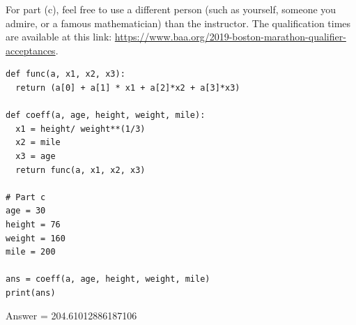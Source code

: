 \documentclass[10pt]{exam}
\begin{document}
\begin{questions}
For part (c), feel free to use a different person (such as yourself, someone you admire, or a famous mathematician) than the instructor. The qualification times are available at this link: \url{https://www.baa.org/2019-boston-marathon-qualifier-acceptances}.
\begin{lstlisting}
def func(a, x1, x2, x3):
  return (a[0] + a[1] * x1 + a[2]*x2 + a[3]*x3)

def coeff(a, age, height, weight, mile):
  x1 = height/ weight**(1/3)
  x2 = mile
  x3 = age
  return func(a, x1, x2, x3)

# Part c
age = 30
height = 76
weight = 160
mile = 200

ans = coeff(a, age, height, weight, mile)
print(ans) 
\end{lstlisting}
Answer = 204.61012886187106
\end{questions}
\end{document}
